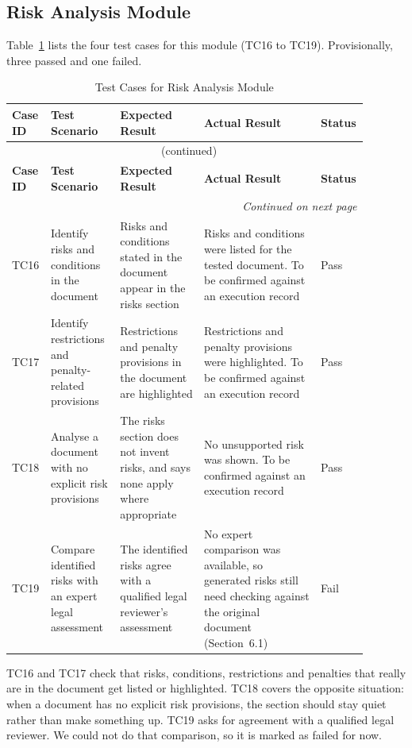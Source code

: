 \documentclass[12pt,a4paper,oneside]{report}
\begin{document}
\subsection{Risk Analysis Module}
Table~\ref{tab:risk} lists the four test cases for this module (TC16 to TC19). Provisionally, three passed and one failed.
{\footnotesize
\setlength{\tabcolsep}{3pt}
\renewcommand{\arraystretch}{1.15}
\begin{longtable}{|p{0.075\linewidth}|p{0.19\linewidth}|p{0.23\linewidth}|p{0.32\linewidth}|p{0.08\linewidth}|}
\caption{Test Cases for Risk Analysis Module}\label{tab:risk}\\
\hline
\textbf{Case ID} & \textbf{Test Scenario} & \textbf{Expected Result} & \textbf{Actual Result} & \textbf{Status}\\
\hline
\endfirsthead
\multicolumn{5}{c}{\tablename~\thetable{} (continued)}\\
\hline
\textbf{Case ID} & \textbf{Test Scenario} & \textbf{Expected Result} & \textbf{Actual Result} & \textbf{Status}\\
\hline
\endhead
\hline
\multicolumn{5}{r}{\emph{Continued on next page}}\\
\endfoot
\hline
\endlastfoot
TC16 & Identify risks and conditions in the document & Risks and conditions stated in the document appear in the risks section & Risks and conditions were listed for the tested document. To be confirmed against an execution record & Pass\\
\hline
TC17 & Identify restrictions and penalty-related provisions & Restrictions and penalty provisions in the document are highlighted & Restrictions and penalty provisions were highlighted. To be confirmed against an execution record & Pass\\
\hline
TC18 & Analyse a document with no explicit risk provisions & The risks section does not invent risks, and says none apply where appropriate & No unsupported risk was shown. To be confirmed against an execution record & Pass\\
\hline
TC19 & Compare identified risks with an expert legal assessment & The identified risks agree with a qualified legal reviewer's assessment & No expert comparison was available, so generated risks still need checking against the original document (Section~6.1) & Fail\\
\end{longtable}
}

TC16 and TC17 check that risks, conditions, restrictions and penalties that really are in the document get listed or highlighted. TC18 covers the opposite situation: when a document has no explicit risk provisions, the section should stay quiet rather than make something up. TC19 asks for agreement with a qualified legal reviewer. We could not do that comparison, so it is marked as failed for now.
\end{document}
